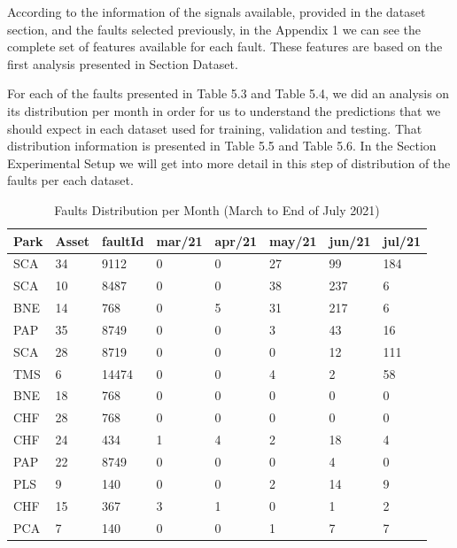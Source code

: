 According to the information of the signals available, provided in the dataset section, and the faults selected previously, in the Appendix 1 we can see the complete set of features available for each fault. These features are based on the first analysis presented in Section Dataset.

For each of the faults presented in Table 5.3 and Table 5.4, we did an analysis on its distribution per month in order for us to understand the predictions that we should expect in each dataset used for training, validation and testing. That distribution information is presented in Table 5.5 and Table 5.6. In the Section Experimental Setup we will get into more detail in this step of distribution of the faults per each dataset.

\begin{table}[!ht]
    \centering
    \begin{tabular}{|l|l|l|l|l|l|l|l|}
    \hline
        Park & Asset & faultId & mar/21 & apr/21 & may/21 & jun/21 & jul/21 \\ \hline
        SCA & 34 & 9112 & 0 & 0 & 27 & 99 & 184 \\ \hline
        SCA & 10 & 8487 & 0 & 0 & 38 & 237 & 6 \\ \hline
        BNE & 14 & 768 & 0 & 5 & 31 & 217 & 6 \\ \hline
        PAP & 35 & 8749 & 0 & 0 & 3 & 43 & 16 \\ \hline
        SCA & 28 & 8719 & 0 & 0 & 0 & 12 & 111 \\ \hline
        TMS & 6 & 14474 & 0 & 0 & 4 & 2 & 58 \\ \hline
        BNE & 18 & 768 & 0 & 0 & 0 & 0 & 0 \\ \hline
        CHF & 28 & 768 & 0 & 0 & 0 & 0 & 0 \\ \hline
        CHF & 24 & 434 & 1 & 4 & 2 & 18 & 4 \\ \hline
        PAP & 22 & 8749 & 0 & 0 & 0 & 4 & 0 \\ \hline
        PLS & 9 & 140 & 0 & 0 & 2 & 14 & 9 \\ \hline
        CHF & 15 & 367 & 3 & 1 & 0 & 1 & 2 \\ \hline
        PCA & 7 & 140 & 0 & 0 & 1 & 7 & 7 \\ \hline
    \end{tabular}
    \caption{Faults Distribution per Month (March to End of July 2021)}
    \label{FaultsDistribitutionMarJun21}
\end{table}

